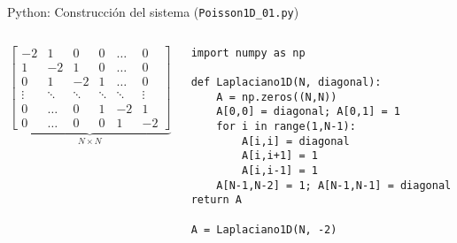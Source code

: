 \documentclass[handout]{beamer}
\begin{document}
\lstset{language=python}
\lstset{basicstyle=\tiny}
\lstset{commentstyle=\textit}
\lstset{frame=trbl}

\begin{frame}[fragile]{Python: Construcci\'on del sistema (\texttt{Poisson1D\_01.py})}

\begin{columns}
	\begin{column}{0.5\textwidth}
{\footnotesize \[
\underbrace{\left[
\begin{matrix}
	-2 & 1 & 0 & 0 & \dots & 0  \\
	1 & -2 & 1 & 0 & \dots & 0  \\
	0 & 1 & -2 & 1 & \dots & 0  \\
	\vdots & \ddots & \ddots & \ddots & \ddots & \vdots \\
	0 & \dots & 0 & 1 & -2 & 1   \\
	0 & \dots & 0 & 0 & 1 & -2    
\end{matrix}
\right]}_{N \times N}
\]}
	\end{column}
	\begin{column}{0.5\textwidth}  %

\begin{lstlisting}
import numpy as np

def Laplaciano1D(N, diagonal):
    A = np.zeros((N,N))
    A[0,0] = diagonal; A[0,1] = 1
    for i in range(1,N-1):
        A[i,i] = diagonal
        A[i,i+1] = 1
        A[i,i-1] = 1
    A[N-1,N-2] = 1; A[N-1,N-1] = diagonal
return A

A = Laplaciano1D(N, -2)
\end{lstlisting}		

	\end{column}
\end{columns}

\pause


\end{frame}
\end{document}
